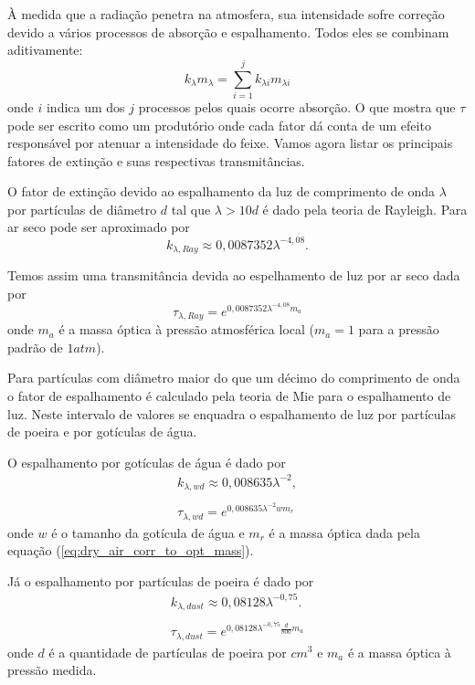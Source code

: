 \documentclass[12pt,a4paper]{article}
\begin{document}
	À medida que a radiação penetra na atmosfera, sua intensidade sofre
	correção devido a vários processos de absorção e espalhamento. Todos eles
	se combinam aditivamente:
	\begin{equation}
		k_{\lambda}m_{\lambda} = \sum_{i=1}^{j} k_{\lambda i}m_{\lambda i}
	\end{equation}
	onde $i$ indica um dos $j$ processos pelos quais ocorre absorção.
	O que mostra que $\tau$ pode ser escrito como um produtório onde cada fator 
	dá conta de um efeito responsável por atenuar a intensidade do feixe.
	Vamos agora listar os principais fatores de extinção e suas respectivas 
	transmitâncias.

	O fator de extinção devido ao espalhamento da luz de comprimento de onda $\lambda$ 
	por partículas de diâmetro $d$ tal que $\lambda > 10 d$ é dado pela teoria de Rayleigh.
	Para ar seco pode ser aproximado por 
	\begin{equation}
		k_{\lambda,Ray} \approx 0,0087352\lambda^{-4,08}. \label{eq:dry_air_extinc_fac_scat_rayl}
	\end{equation}

	Temos assim uma transmitância devida ao espelhamento de luz por ar seco dada por
	\begin{equation}
		\tau_{\lambda,Ray} = e^{0,0087352\lambda^{-4,08}m_a} \label{eq:dry_air_rayl_scat_transm}
	\end{equation}
	onde $m_a$ é a massa óptica à pressão atmosférica local ($m_a=1$ para a pressão padrão de $1atm$).

	Para partículas com diâmetro maior do que um décimo do comprimento de onda
	o fator de espalhamento é calculado pela teoria de Mie para o espalhamento
	de luz. Neste intervalo de valores se enquadra o espalhamento de luz por
	partículas de poeira e por gotículas de água.

	O espalhamento por gotículas de água é dado por
	\begin{eqnarray}
		k_{\lambda,wd} \approx 0,008635\lambda^{-2},\\
		\nonumber \\
		\tau_{\lambda,wd} = e^{0,008635\lambda^{-2}w m_r}  \label{eq:wat_droplets_scat_transm}
	\end{eqnarray}
	onde $w$ é o tamanho da gotícula de água e $m_r$ é a massa óptica
	dada pela equação (\ref{eq:dry_air_corr_to_opt_mass}).

	Já o espalhamento por partículas de poeira é dado por
	\begin{eqnarray}
		k_{\lambda,dust} \approx 0,08128\lambda^{-0,75}.\\
		\nonumber \\
		\tau_{\lambda,dust} = e^{0,08128\lambda^{-0,75}\frac{d}{800}m_a}   \label{eq:dust_scat_transm}
	\end{eqnarray}
	onde $d$ é a quantidade de partículas de poeira por $cm^3$ e $m_a$ é a 
	massa óptica à pressão medida.
\end{document}

